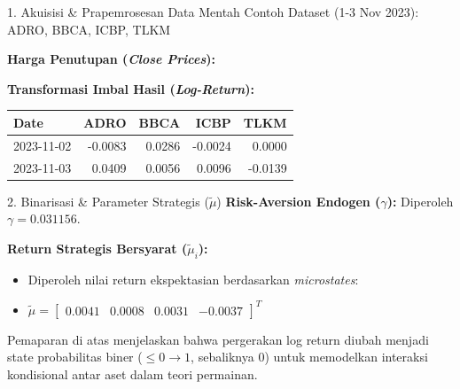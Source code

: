 \begin{frame}{1. Akuisisi \& Prapemrosesan Data Mentah}
Contoh Dataset (1-3 Nov 2023): ADRO, BBCA, ICBP, TLKM
\vspace{0.2cm}

\textbf{Harga Penutupan (\textit{Close Prices}):}
\begin{table}[]
\end{table}

\textbf{Transformasi Imbal Hasil (\textit{Log-Return}):}
\begin{table}[]
\begin{tabular}{lrrrr}
\toprule
Date & ADRO & BBCA & ICBP & TLKM \\
\midrule
2023-11-02 & -0.0083 & 0.0286 & -0.0024 & 0.0000 \\
2023-11-03 & 0.0409 & 0.0056 & 0.0096 & -0.0139 \\
\bottomrule
\end{tabular}
\end{table}
\end{frame}

\begin{frame}{2. Binarisasi \& Parameter Strategis ($\tilde{\mu}$)}
\textbf{Risk-Aversion Endogen ($\gamma$):} Diperoleh $\gamma = 0.031156$.

\vspace{0.3cm}
\textbf{Return Strategis Bersyarat ($\tilde{\mu}_i$):}
\begin{itemize}
    \item Diperoleh nilai return ekspektasian berdasarkan \textit{microstates}:
    \item $\tilde{\mu} = \begin{bmatrix} 0.0041 &  0.0008 &  0.0031 & -0.0037 \end{bmatrix}^T$
\end{itemize}

\vspace{0.3cm}
Pemaparan di atas menjelaskan bahwa pergerakan log return diubah menjadi state probabilitas biner ($\leq 0 \rightarrow 1$, sebaliknya $0$) untuk memodelkan interaksi kondisional antar aset dalam teori permainan.
\end{frame}
